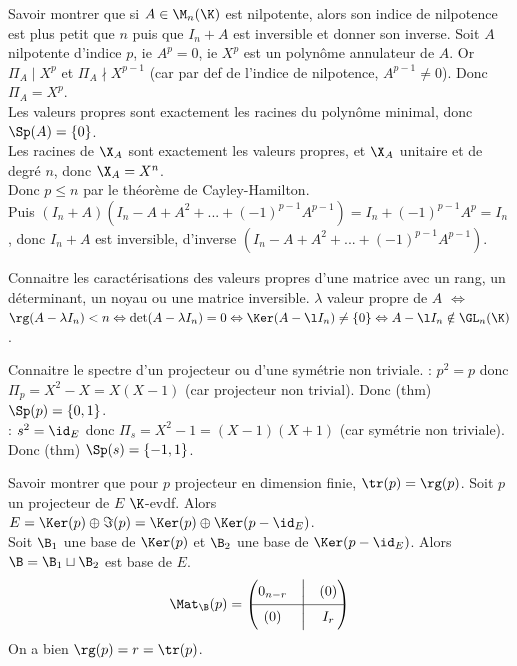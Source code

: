 \documentclass[french, 11pt]{article}
\begin{document}
\begin{exercice}{}{}
    Savoir montrer que si $A \in \M_n(\K)$ est nilpotente, alors son indice de nilpotence est plus petit que $n$ puis que $I_n + A$ est inversible et donner son inverse.
    \tcblower
    Soit $A$ nilpotente d'indice $p$, ie $A^p = 0$, ie $X^p$ est un polynôme annulateur de $A$. Or $\Pi_A \mid X^p$ et $\Pi_A \nmid X^{p-1}$ (car par def de l'indice de nilpotence, $A^{p-1} \ne 0$). Donc $\Pi_A = X^p$.\\
    Les valeurs propres sont exactement les racines du polynôme minimal, donc $\Sp(A)=\{0\}$.\\
    Les racines de $\X_A$ sont exactement les valeurs propres, et $\X_A$ unitaire et de degré $n$, donc $\X_A=X^n$.\\
    Donc $p\leq n$ par le théorème de Cayley-Hamilton.\\
    Puis $(I_n + A)(I_n - A + A^2+...+(-1)^{p-1}A^{p-1}) = I_n + (-1)^{p-1}A^p = I_n$, donc $I_n + A$ est inversible, d'inverse $(I_n - A + A^2+...+(-1)^{p-1}A^{p-1})$.
\end{exercice}

\begin{exercice}{}{}
    Connaitre les caractérisations des valeurs propres d'une matrice avec un rang, un déterminant, un noyau ou une matrice inversible.
    \tcblower
    $\lambda$ valeur propre de $A$ $\Leftrightarrow$ $\rg(A - \lambda I_n) < n \Leftrightarrow \det(A - \lambda I_n) = 0 \Leftrightarrow \Ker(A-\l I_n) \ne \{0\} \Leftrightarrow A - \l I_n \notin \GL_n(\K)$.
\end{exercice}

\begin{exercice}{}{}
    Connaitre le spectre d'un projecteur ou d'une symétrie non triviale.
    \tcblower
     : $p^2 = p$ donc $\Pi_p = X^2-X = X(X-1)$ (car projecteur non trivial). Donc (thm) $\Sp(p) = \{0,1\}$.\\
     : $s^2 = \id_E$ donc $\Pi_s = X^2 - 1 = (X-1)(X+1)$ (car symétrie non triviale). Donc (thm) $\Sp(s) = \{-1,1\}$.
\end{exercice}

\begin{exercice}{}{}
    Savoir montrer que pour $p$ projecteur en dimension finie, $\tr(p) = \rg(p)$.
    \tcblower
    Soit $p$ un projecteur de $E$ $\K$-evdf. Alors $E=\Ker(p)\oplus\Im(p)=\Ker(p)\oplus\Ker(p-\id_E)$.\\
    Soit $\B_1$ une base de $\Ker(p)$ et $\B_2$ une base de $\Ker(p-\id_E)$. Alors $\B=\B_1\sqcup\B_2$ est base de $E$.
    \begin{equation*}
        \Mat_\B(p)=\begin{pmatrix} 0_{n-r} & \Big| & (0) \\ \hline (0) & \Big| & I_{r}\end{pmatrix}
    \end{equation*}
    On a bien $\rg(p) = r = \tr(p)$.
\end{exercice}
\end{document}

